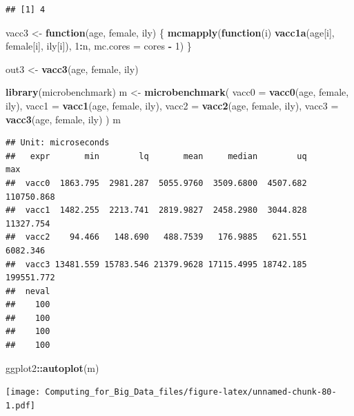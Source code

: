 \documentclass[]{book}
\newenvironment{Shaded}{\begin{snugshade}}{\end{snugshade}}
\newcommand{\KeywordTok}[1]{\textcolor[rgb]{0.13,0.29,0.53}{\textbf{#1}}}
\newcommand{\DataTypeTok}[1]{\textcolor[rgb]{0.13,0.29,0.53}{#1}}
\newcommand{\DecValTok}[1]{\textcolor[rgb]{0.00,0.00,0.81}{#1}}
\newcommand{\StringTok}[1]{\textcolor[rgb]{0.31,0.60,0.02}{#1}}
\newcommand{\ControlFlowTok}[1]{\textcolor[rgb]{0.13,0.29,0.53}{\textbf{#1}}}
\newcommand{\OperatorTok}[1]{\textcolor[rgb]{0.81,0.36,0.00}{\textbf{#1}}}
\newcommand{\NormalTok}[1]{#1}
\theoremstyle{definition}
\theoremstyle{definition}
\theoremstyle{definition}
\theoremstyle{remark}
\begin{document}
\begin{verbatim}
## [1] 4
\end{verbatim}

\begin{Shaded}
\begin{Highlighting}[]
\NormalTok{vacc3 <-}\StringTok{ }\ControlFlowTok{function}\NormalTok{(age, female, ily) \{}
  \KeywordTok{mcmapply}\NormalTok{(}\ControlFlowTok{function}\NormalTok{(i) }\KeywordTok{vacc1a}\NormalTok{(age[i], female[i], ily[i]), }\DecValTok{1}\OperatorTok{:}\NormalTok{n, }\DataTypeTok{mc.cores =}\NormalTok{ cores }\OperatorTok{-}\StringTok{ }\DecValTok{1}\NormalTok{)}
\NormalTok{\}}

\NormalTok{out3 <-}\StringTok{ }\KeywordTok{vacc3}\NormalTok{(age, female, ily)}
\end{Highlighting}
\end{Shaded}

\begin{Shaded}
\begin{Highlighting}[]
\KeywordTok{library}\NormalTok{(microbenchmark)}
\NormalTok{m <-}\StringTok{ }\KeywordTok{microbenchmark}\NormalTok{(}
  \DataTypeTok{vacc0 =} \KeywordTok{vacc0}\NormalTok{(age, female, ily),}
  \DataTypeTok{vacc1 =} \KeywordTok{vacc1}\NormalTok{(age, female, ily),}
  \DataTypeTok{vacc2 =} \KeywordTok{vacc2}\NormalTok{(age, female, ily),}
  \DataTypeTok{vacc3 =} \KeywordTok{vacc3}\NormalTok{(age, female, ily)}
\NormalTok{)}
\NormalTok{m}
\end{Highlighting}
\end{Shaded}

\begin{verbatim}
## Unit: microseconds
##   expr       min        lq       mean     median        uq        max
##  vacc0  1863.795  2981.287  5055.9760  3509.6800  4507.682 110750.868
##  vacc1  1482.255  2213.741  2819.9827  2458.2980  3044.828  11327.754
##  vacc2    94.466   148.690   488.7539   176.9885   621.551   6082.346
##  vacc3 13481.559 15783.546 21379.9628 17115.4995 18742.185 199551.772
##  neval
##    100
##    100
##    100
##    100
\end{verbatim}

\begin{Shaded}
\begin{Highlighting}[]
\NormalTok{ggplot2}\OperatorTok{::}\KeywordTok{autoplot}\NormalTok{(m)}
\end{Highlighting}
\end{Shaded}

\texttt{[image: Computing\_for\_Big\_Data\_files/figure-latex/unnamed-chunk-80-1.pdf]}
\end{document}
